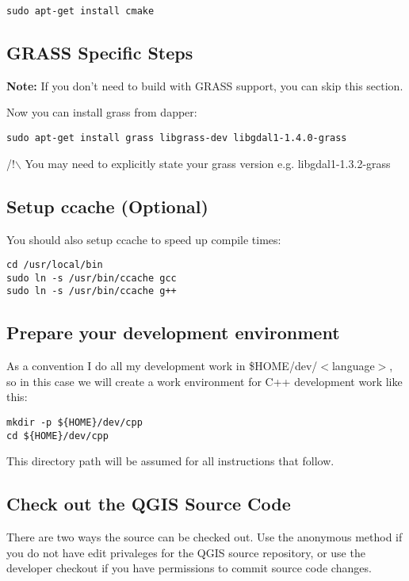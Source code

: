 \begin{verbatim}
sudo apt-get install cmake
\end{verbatim}

\subsection{GRASS Specific Steps}
\textbf{Note:} If you don't need to build with GRASS support,  you can
skip this section.

Now you can install grass from dapper:

\begin{verbatim}
sudo apt-get install grass libgrass-dev libgdal1-1.4.0-grass 
\end{verbatim}

/!$\backslash$ You may need to explicitly state your grass version e.g. libgdal1-1.3.2-grass

\subsection{Setup ccache (Optional)}
You should also setup ccache to speed up compile times:

\begin{verbatim}
cd /usr/local/bin 
sudo ln -s /usr/bin/ccache gcc 
sudo ln -s /usr/bin/ccache g++ 
\end{verbatim}

\subsection{Prepare your development environment}
As a convention I do all my development work in \$HOME/dev/$<$language$>$, so in
this case we will create a work environment for C++ development work like
this:

\begin{verbatim}
mkdir -p ${HOME}/dev/cpp 
cd ${HOME}/dev/cpp 
\end{verbatim}

This directory path will be assumed for all instructions that follow.

\subsection{Check out the QGIS Source Code}
There are two ways the source can be checked out. Use the anonymous method
if you do not have edit privaleges for the QGIS source repository, or use
  the developer checkout if you have permissions to commit source code
  changes.

